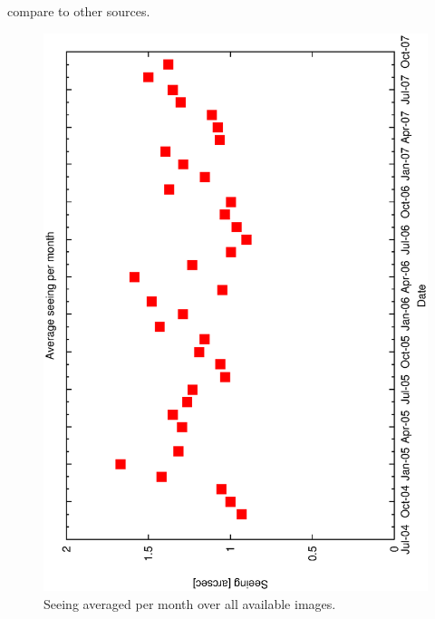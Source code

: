{{compare to other sources.

\begin{figure}[htbp]
\begin{center}
    \includegraphics[scale=0.4, angle=-90]{figures/ecs/corr_see_monthly.eps}
\end{center} 
\caption[Corrected seeing avergared per month over available images.]
{Seeing averaged per month over all available images.}
\label{fig:monthly_seeing}
\end{figure}

}}
